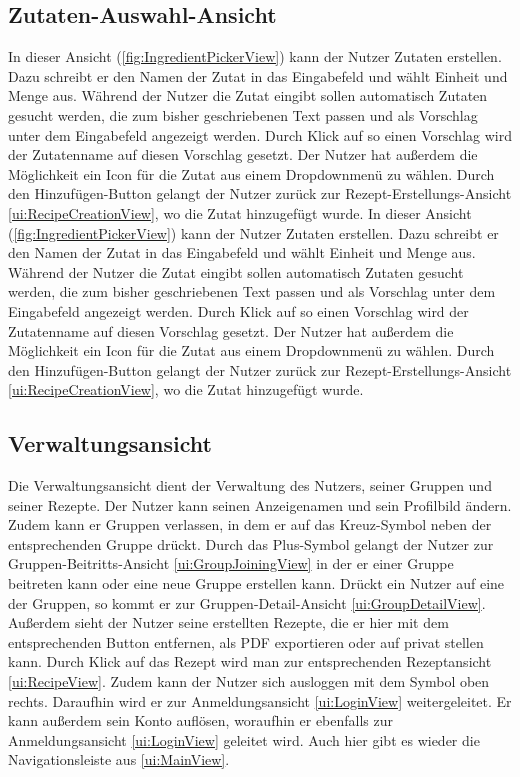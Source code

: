 \documentclass[parskip=full]{scrartcl}
\begin{document}
\subsection{Zutaten-Auswahl-Ansicht}
\label{ui:IngredientPickerView}
In dieser Ansicht (\autoref{fig:IngredientPickerView}) kann der Nutzer Zutaten erstellen. Dazu schreibt er den Namen der Zutat in das Eingabefeld und wählt Einheit und Menge aus. Während der Nutzer die Zutat eingibt sollen automatisch Zutaten gesucht werden, die zum bisher geschriebenen Text passen und als Vorschlag unter dem Eingabefeld angezeigt werden. Durch Klick auf so einen Vorschlag wird der Zutatenname auf diesen Vorschlag gesetzt. Der Nutzer hat außerdem die Möglichkeit ein Icon für die Zutat aus einem Dropdownmenü zu wählen. Durch den Hinzufügen-Button gelangt der Nutzer zurück zur Rezept-Erstellungs-Ansicht \ref{ui:RecipeCreationView}, wo die Zutat hinzugefügt wurde.
In dieser Ansicht (\autoref{fig:IngredientPickerView}) kann der Nutzer Zutaten erstellen. Dazu schreibt er den Namen der Zutat in das Eingabefeld und wählt Einheit und Menge aus. Während der Nutzer die Zutat eingibt sollen automatisch Zutaten gesucht werden, die zum bisher geschriebenen Text passen und als Vorschlag unter dem Eingabefeld angezeigt werden. Durch Klick auf so einen Vorschlag wird der Zutatenname auf diesen Vorschlag gesetzt. Der Nutzer hat außerdem die Möglichkeit ein Icon für die Zutat aus einem Dropdownmenü zu wählen. Durch den Hinzufügen-Button gelangt der Nutzer zurück zur Rezept-Erstellungs-Ansicht \ref{ui:RecipeCreationView}, wo die Zutat hinzugefügt wurde.


\subsection{Verwaltungsansicht}
\label{ui:SettingsView}

Die Verwaltungsansicht dient der Verwaltung des Nutzers, seiner Gruppen und seiner Rezepte. Der Nutzer kann seinen Anzeigenamen und sein Profilbild ändern. Zudem kann er Gruppen verlassen, in dem er auf das Kreuz-Symbol neben der entsprechenden Gruppe drückt. Durch das Plus-Symbol gelangt der Nutzer zur Gruppen-Beitritts-Ansicht \ref{ui:GroupJoiningView} in der er einer Gruppe beitreten kann oder eine neue Gruppe erstellen kann. Drückt ein Nutzer auf eine der Gruppen, so kommt er zur Gruppen-Detail-Ansicht \ref{ui:GroupDetailView}. Außerdem sieht der Nutzer seine erstellten Rezepte, die er hier mit dem entsprechenden Button entfernen, als PDF exportieren oder auf privat stellen kann. Durch Klick auf das Rezept wird man zur entsprechenden Rezeptansicht \ref{ui:RecipeView}.
Zudem kann der Nutzer sich ausloggen mit dem Symbol oben rechts. Daraufhin wird er zur Anmeldungsansicht \ref{ui:LoginView} weitergeleitet. Er kann außerdem sein Konto auflösen, woraufhin er ebenfalls zur Anmeldungsansicht \ref{ui:LoginView} geleitet wird. Auch hier gibt es wieder die Navigationsleiste aus \ref{ui:MainView}.
\end{document}
